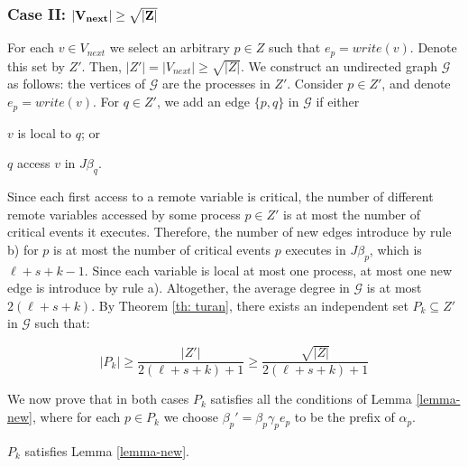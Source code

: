 \subsubsection*{\hspace{5mm} Case II: $\bf |V_{next}| \geq \sqrt{|Z|}$}

For each $v \in V_{next}$ we select an arbitrary $p \in Z$ such that $e_p = write(v)$. Denote this set by $Z'$. Then, $|Z'|=|V_{next}| \geq \sqrt{|Z|}$.
We construct an undirected graph $\mathcal{G}$ as follows: the vertices of $\mathcal{G}$ are the processes in $Z'$. Consider $p \in Z'$, and denote $e_p = write(v)$. For $q \in Z'$, we add an edge $\{p,q\}$ in $\mathcal{G}$ if either
\begin{inparaenum}
	\item $v$ is local to $q$; or
	\item $q$ access $v$ in $J \beta_q$.
\end{inparaenum}

Since each first access to a remote variable is critical, the number of different remote variables accessed by some process $p \in Z'$ is at most the number of critical events it executes. Therefore, the number of new edges introduce by rule b) for $p$ is at most the number of critical events $p$ executes in $J \beta_p$, which is $\ell+s+k-1$. Since each variable is local at most one process, at most one new edge is introduce by rule a).
Altogether, the average degree in $\mathcal{G}$ is at most $2(\ell+s+k)$. By Theorem \ref{th: turan}, there exists an independent set $P_k \subseteq Z'$ in $\mathcal{G}$ such that:

$$ |P_k| \geq \frac{|Z'|}{2(\ell+s+k)+1} \geq \frac{\sqrt{|Z|}}{2(\ell+s+k)+1}$$

We now prove that in both cases $P_k$ satisfies all the conditions of Lemma \ref{lemma-new}, where for each $p \in P_k$ we choose $\beta_p' = \beta_p \gamma_p e_p$ to be the prefix of $\alpha_p$.

\begin{claim-subsection}
	$P_k$ satisfies Lemma \ref{lemma-new}.
\end{claim-subsection}
 

